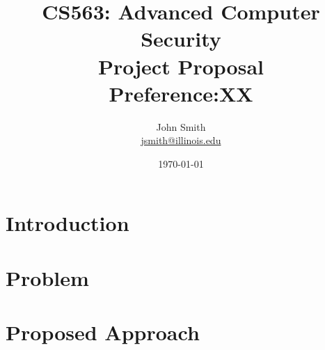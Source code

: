 \documentclass{article}
\title{\vspace{-3.0cm}CS563: Advanced Computer Security \\ Project Proposal \\ Preference:XX}
\author{John Smith \\
\href{mailto:jsmith@illinois.edu}{jsmith@illinois.edu}}
\date{\today}
\begin{document}
\maketitle

\section{Introduction}

\label{introduction}

\section{Problem}

\label{problem}

\section{Proposed Approach}

\label{proposed-approach}




 
\end{document}
